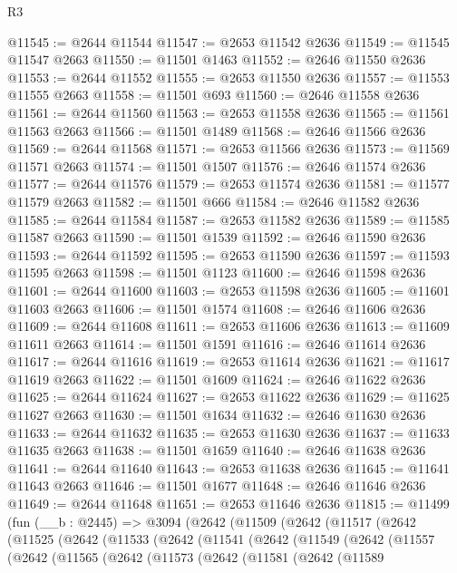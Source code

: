 \begin{lexlean}{R3}
\begin{coremodule}
@11545 := @2644 @11544
@11547 := @2653 @11542 @2636
@11549 := @11545 @11547 @2663
@11550 := @11501 @1463
@11552 := @2646 @11550 @2636
@11553 := @2644 @11552
@11555 := @2653 @11550 @2636
@11557 := @11553 @11555 @2663
@11558 := @11501 @693
@11560 := @2646 @11558 @2636
@11561 := @2644 @11560
@11563 := @2653 @11558 @2636
@11565 := @11561 @11563 @2663
@11566 := @11501 @1489
@11568 := @2646 @11566 @2636
@11569 := @2644 @11568
@11571 := @2653 @11566 @2636
@11573 := @11569 @11571 @2663
@11574 := @11501 @1507
@11576 := @2646 @11574 @2636
@11577 := @2644 @11576
@11579 := @2653 @11574 @2636
@11581 := @11577 @11579 @2663
@11582 := @11501 @666
@11584 := @2646 @11582 @2636
@11585 := @2644 @11584
@11587 := @2653 @11582 @2636
@11589 := @11585 @11587 @2663
@11590 := @11501 @1539
@11592 := @2646 @11590 @2636
@11593 := @2644 @11592
@11595 := @2653 @11590 @2636
@11597 := @11593 @11595 @2663
@11598 := @11501 @1123
@11600 := @2646 @11598 @2636
@11601 := @2644 @11600
@11603 := @2653 @11598 @2636
@11605 := @11601 @11603 @2663
@11606 := @11501 @1574
@11608 := @2646 @11606 @2636
@11609 := @2644 @11608
@11611 := @2653 @11606 @2636
@11613 := @11609 @11611 @2663
@11614 := @11501 @1591
@11616 := @2646 @11614 @2636
@11617 := @2644 @11616
@11619 := @2653 @11614 @2636
@11621 := @11617 @11619 @2663
@11622 := @11501 @1609
@11624 := @2646 @11622 @2636
@11625 := @2644 @11624
@11627 := @2653 @11622 @2636
@11629 := @11625 @11627 @2663
@11630 := @11501 @1634
@11632 := @2646 @11630 @2636
@11633 := @2644 @11632
@11635 := @2653 @11630 @2636
@11637 := @11633 @11635 @2663
@11638 := @11501 @1659
@11640 := @2646 @11638 @2636
@11641 := @2644 @11640
@11643 := @2653 @11638 @2636
@11645 := @11641 @11643 @2663
@11646 := @11501 @1677
@11648 := @2646 @11646 @2636
@11649 := @2644 @11648
@11651 := @2653 @11646 @2636
@11815 := @11499
    (fun (__b : @2445) =>
    @3094
      (@2642
        (@11509
          (@2642
            (@11517
              (@2642
                (@11525
                  (@2642
                    (@11533
                      (@2642
                        (@11541
                          (@2642
                            (@11549
                              (@2642
                                (@11557
                                  (@2642
                                    (@11565
                                      (@2642
                                        (@11573
                                          (@2642
                                            (@11581
                                              (@2642
                                                (@11589

\end{coremodule}
\end{lexlean}
